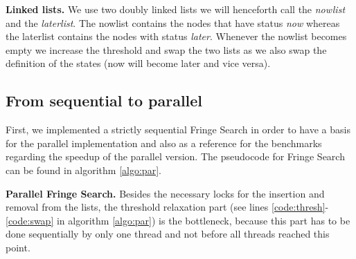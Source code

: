 \documentclass[letterpaper]{article}
\newcommand{\mypar}[1]{{\bf #1.}}
\begin{document}
\mypar{Linked lists}
We use two doubly linked lists we will henceforth call the \textit{nowlist} and the \textit{laterlist}. The nowlist contains the nodes that have status \textit{now} whereas the laterlist contains the nodes with status \textit{later}. Whenever the nowlist becomes empty we increase the threshold and swap the two lists as we also swap the definition of the states (now will become later and vice versa). 

\subsection{From sequential to parallel}\label{ssec:seqpar}

First, we implemented a strictly sequential Fringe Search in order to have a basis for the parallel implementation and also as a reference for the benchmarks regarding the speedup of the parallel version. The pseudocode for Fringe Search can be found in algorithm \ref{algo:par}.

\mypar{Parallel Fringe Search}
Besides the necessary locks for the insertion and removal from the lists, the threshold relaxation part (see lines \ref{code:thresh}-\ref{code:swap} in algorithm \ref{algo:par}) is the bottleneck, because this part has to be done sequentially by only one thread and not before all threads reached this point.
\end{document}
